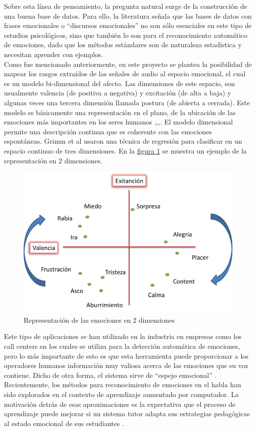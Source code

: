 \documentclass[11pt,lettersize]{article} %
\newcommand{\figura}[1]{\hyperref[{#1}]{figura \ref*{#1}}}
\begin{document}
Sobre esta línea de pensamiento, la pregunta natural surge de la construcción de una buena base de datos. Para ello, la literatura señala que las bases de datos con frases emocionales o ``discursos emocionales'' no son sólo esenciales en este tipo de estudios psicológicos, sino que también lo son para el reconocimiento automático de emociones, dado que los métodos estándares son de naturaleza estadística y necesitan aprender con ejemplos.\\

Como fue mencionado anteriormente, en este proyecto se plantea la posibilidad de mapear los rasgos extraídos de las señales de audio al espacio emocional, el cual es un modelo bi-dimensional del afecto. Las dimensiones de este espacio, son usualmente valencia (de positiva a negativa) y excitación (de alta a baja) y algunas veces una tercera dimensión llamada postura (de abierta a cerrada). Este modelo es básicamente una representación en el plano, de la ubicación de las emociones más importantes en los seres humanos \cite{Russell1979},\cite{Russell1980},\cite{Russell1989},\cite{Russell1999}. El modelo dimensional permite una descripción continua que es coherente con las emociones espontáneas. Grimm et al \cite{Grimm2007} usaron una técnica de regresión para clasificar en un espacio continuo de tres dimensiones. En la \figura{F-dimensions-emotion} se muestra un ejemplo de la representación en 2 dimensiones.

\begin{figure}[h!]
	\centering
	\includegraphics[width=.6\textwidth]{images/Two_Dimensions_of_Emotion.png}
	\caption[Representación de las emociones en 2 dimensiones]{Representación de las emociones en 2 dimensiones}
	\label{F-dimensions-emotion}
\end{figure}

Este tipo de aplicaciones se han utilizado en la industria en empresas como los call centers en los cuales se utiliza para la detección automática de emociones, pero lo más importante de esto es que esta herramienta puede proporcionar a los operadores humanos información muy valiosa acerca de las emociones que su voz contiene. Dicho de otra forma, el sistema sirve de ``espejo emocional'' \cite{Pickard1997}. Recientemente, los métodos para reconocimiento de emociones en el habla han sido explorados en el contexto de aprendizaje aumentado por computador. La motivación detrás de esas aproximaciones es la expectativa que el proceso de aprendizaje puede mejorar si un sistema tutor adapta sus estrategias pedagógicas al estado emocional de sus estudiantes \cite{Ai2006}.\\
\end{document}
